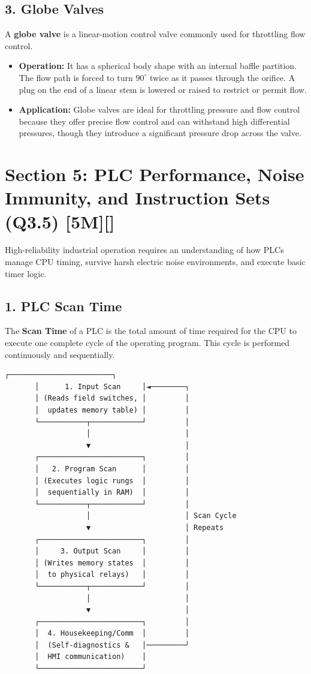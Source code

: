 \subsection{3. Globe Valves}
A \textbf{globe valve} is a linear-motion control valve commonly used for throttling flow control.
\begin{itemize}
  \item \textbf{Operation:} It has a spherical body shape with an internal baffle partition. The flow path is forced to turn $90^\circ$ twice as it passes through the orifice. A plug on the end of a linear stem is lowered or raised to restrict or permit flow.
  \item \textbf{Application:} Globe valves are ideal for throttling pressure and flow control because they offer precise flow control and can withstand high differential pressures, though they introduce a significant pressure drop across the valve.
\end{itemize}


\section{Section 5: PLC Performance, Noise Immunity, and Instruction Sets (Q3.5) [5M][]}

High-reliability industrial operation requires an understanding of how PLCs manage CPU timing, survive harsh electric noise environments, and execute basic timer logic.


\subsection{1. PLC Scan Time}
The \textbf{Scan Time} of a PLC is the total amount of time required for the CPU to execute one complete cycle of the operating program. This cycle is performed continuously and sequentially.

\begin{lstlisting}
┌────────────────────────┐
       │      1. Input Scan     │◄────────┐
       │ (Reads field switches, │         │
       │  updates memory table) │         │
       └───────────┬────────────┘         │
                   │                      │
                   ▼                      │
       ┌────────────────────────┐         │
       │   2. Program Scan      │         │
       │ (Executes logic rungs  │         │
       │  sequentially in RAM)  │         │
       └───────────┬────────────┘         │
                   │                      │ Scan Cycle
                   ▼                      │ Repeats
       ┌────────────────────────┐         │
       │     3. Output Scan     │         │
       │ (Writes memory states  │         │
       │  to physical relays)   │         │
       └───────────┬────────────┘         │
                   │                      │
                   ▼                      │
       ┌────────────────────────┐         │
       │  4. Housekeeping/Comm  │         │
       │  (Self-diagnostics &   │─────────┘
       │  HMI communication)    │
       └────────────────────────┘
\end{lstlisting}

